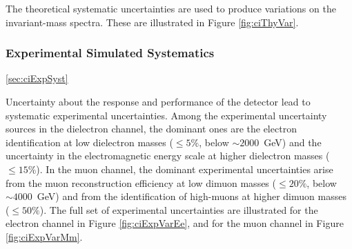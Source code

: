 The theoretical systematic uncertainties are used to produce variations on the invariant-mass spectra.
These are illustrated in Figure \ref{fig:ciThyVar}.



\subsubsection{Experimental Simulated Systematics}\ref{sec:ciExpSyst}

Uncertainty about the response and performance of the detector lead to systematic experimental uncertainties.
Among the experimental uncertainty sources in the dielectron channel, the dominant ones are the electron identification at low dielectron masses ($\leq 5\%$, below $\sim2000$~GeV) and the uncertainty in the electromagnetic energy scale at higher dielectron masses ($\leq 15\%$).
In the muon channel, the dominant experimental uncertainties arise from the muon reconstruction efficiency at low dimuon masses ($\leq 20\%$, below $\sim4000$~GeV) and from the identification of high-\pt muons at higher dimuon masses ($\leq 50\%$).
The full set of experimental uncertainties are illustrated for the electron channel in Figure \ref{fig:ciExpVarEe}, and for the muon channel in Figure \ref{fig:ciExpVarMm}.

